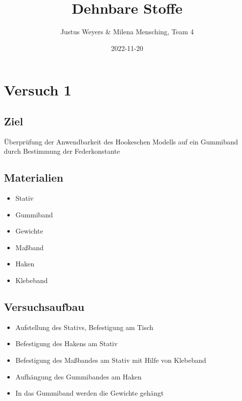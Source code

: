 \documentclass[
]{article}
\title{Dehnbare Stoffe}
\author{Justus Weyers \& Milena Mensching, Team 4}
\date{2022-11-20}
\providecommand{\tightlist}{%
  \setlength{\itemsep}{0pt}\setlength{\parskip}{0pt}}
\begin{document}
\maketitle

\hypertarget{versuch-1}{%
\section{Versuch 1}\label{versuch-1}}

\hypertarget{ziel}{%
\subsection{Ziel}\label{ziel}}

Überprüfung der Anwendbarkeit des Hookeschen Modells auf ein Gummiband
durch Bestimmung der Federkonstante

\hypertarget{materialien}{%
\subsection{Materialien}\label{materialien}}

\begin{itemize}
\tightlist
\item
  Stativ
\item
  Gummiband
\item
  Gewichte
\item
  Maßband
\item
  Haken
\item
  Klebeband
\end{itemize}

\hypertarget{versuchsaufbau}{%
\subsection{Versuchsaufbau}\label{versuchsaufbau}}

\begin{itemize}
\tightlist
\item
  Aufstellung des Stativs, Befestigung am Tisch
\item
  Befestigung des Hakens am Stativ
\item
  Befestigung des Maßbandes am Stativ mit Hilfe von Klebeband
\item
  Aufhängung des Gummibandes am Haken
\item
  In das Gummiband werden die Gewichte gehängt
\end{itemize}
\end{document}
